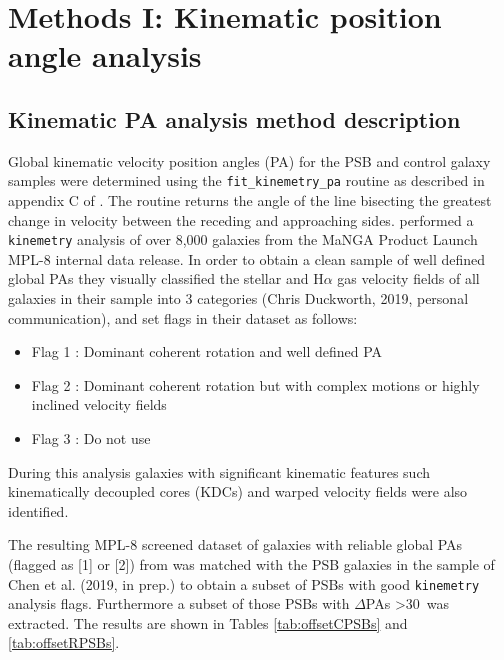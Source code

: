 \section{Methods I: Kinematic position angle analysis}
\label{sec:methods-I-kinemetry}

\subsection{Kinematic PA analysis method description}
\label{kinemetry-analysis-method-description}
Global kinematic velocity position angles (PA) for the PSB and control galaxy samples were determined using the \texttt{fit\_kinemetry\_pa} routine as described in appendix C of \cite{2006MNRAS.366..787K}. The routine returns the angle of the line bisecting the greatest change in velocity between the receding and approaching sides. \cite{2019MNRAS.483..172D} performed a \texttt{kinemetry} analysis of over 8,000 galaxies from the MaNGA Product Launch MPL-8 internal data release. In order to obtain a clean sample of well defined global PAs they visually classified the stellar and H$\alpha$ gas velocity fields of all galaxies in their sample into 3 categories (Chris Duckworth, 2019, personal communication), and set flags in their dataset as follows:

\begin{itemize}
    \item {Flag 1} : Dominant coherent rotation and well defined PA
    \item {Flag 2} : Dominant coherent rotation but with complex motions or highly inclined velocity fields 
    \item {Flag 3} : Do not use
\end{itemize}

During this analysis galaxies with significant kinematic features such kinematically decoupled cores (KDCs) and warped velocity fields were also identified.

The resulting MPL-8 screened dataset of galaxies with reliable global PAs (flagged as [1] or [2]) from \cite{2019MNRAS.483..172D} was matched with the PSB galaxies in the sample of Chen et al. (2019, in prep.) to obtain a subset of PSBs with good \texttt{kinemetry} analysis flags. Furthermore a subset of those PSBs with $\Delta$PAs \textgreater 30\textdegree\ was extracted. The results are shown in Tables \ref{tab:offsetCPSBs} and \ref{tab:offsetRPSBs}. 

